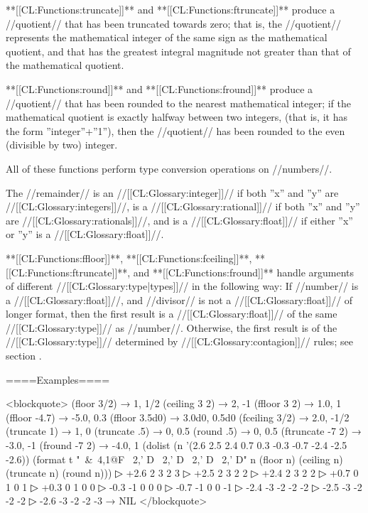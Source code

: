 
**[[CL:Functions:truncate]]** and **[[CL:Functions:ftruncate]]** produce a //quotient// that has been truncated towards zero; that is, the //quotient// represents the mathematical integer of the same sign as the mathematical quotient, and that has the greatest integral magnitude not greater than that of the mathematical quotient.


**[[CL:Functions:round]]** and **[[CL:Functions:fround]]** produce a //quotient// that has been rounded to the nearest mathematical integer; if the mathematical quotient is exactly halfway between two integers, (that is, it has the form ''integer''+''1''), then the //quotient// has been rounded to the even (divisible by two) integer.

\endlist

All of these functions perform type conversion operations on //numbers//.

The //remainder// is an //[[CL:Glossary:integer]]// if both ''x'' and ''y'' are //[[CL:Glossary:integers]]//, is a //[[CL:Glossary:rational]]// if both ''x'' and ''y'' are //[[CL:Glossary:rationals]]//, and is a //[[CL:Glossary:float]]// if either ''x'' or ''y'' is a //[[CL:Glossary:float]]//.

**[[CL:Functions:ffloor]]**, **[[CL:Functions:fceiling]]**, **[[CL:Functions:ftruncate]]**, and **[[CL:Functions:fround]]** handle arguments of different //[[CL:Glossary:type|types]]// in the following way: If //number// is a //[[CL:Glossary:float]]//, and //divisor// is not a //[[CL:Glossary:float]]// of longer format, then the first result is a //[[CL:Glossary:float]]// of the same //[[CL:Glossary:type]]// as //number//. Otherwise, the first result is of the //[[CL:Glossary:type]]// determined by //[[CL:Glossary:contagion]]// rules; see section {\secref\NumericContagionRules}.

====Examples====

<blockquote> (floor 3/2) → 1, 1/2 (ceiling 3 2) → 2, -1 (ffloor 3 2) → 1.0, 1 (ffloor -4.7) → -5.0, 0.3 (ffloor 3.5d0) → 3.0d0, 0.5d0 (fceiling 3/2) → 2.0, -1/2 (truncate 1) → 1, 0 (truncate .5) → 0, 0.5 (round .5) → 0, 0.5 (ftruncate -7 2) → -3.0, -1 (fround -7 2) → -4.0, 1 (dolist (n '(2.6 2.5 2.4 0.7 0.3 -0.3 -0.7 -2.4 -2.5 -2.6)) (format t "~&~4,1@F ~2,' D ~2,' D ~2,' D ~2,' D" n (floor n) (ceiling n) (truncate n) (round n)))
▷ +2.6 2 3 2 3
▷ +2.5 2 3 2 2
▷ +2.4 2 3 2 2
▷ +0.7 0 1 0 1
▷ +0.3 0 1 0 0
▷ -0.3 -1 0 0 0
▷ -0.7 -1 0 0 -1
▷ -2.4 -3 -2 -2 -2
▷ -2.5 -3 -2 -2 -2
▷ -2.6 -3 -2 -2 -3 → NIL </blockquote>

